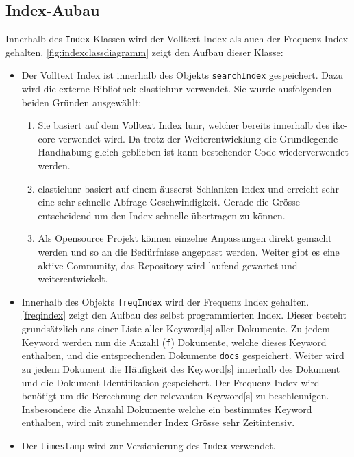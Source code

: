 \subsection{Index-Aubau}\label{indexstructure}
Innerhalb des \texttt{Index} Klassen wird der Volltext Index als auch der Frequenz Index gehalten. \autoref{fig:indexclassdiagramm} zeigt den Aufbau dieser Klasse:
\begin{itemize}
  \item Der Volltext Index ist innerhalb des Objekts \texttt{searchIndex} gespeichert. Dazu wird die externe Bibliothek \gls{elasticlunr} verwendet. Sie wurde ausfolgenden beiden Gründen ausgewählt:
  \begin{enumerate}
       \item Sie basiert auf dem Volltext Index \gls{lunr}, welcher bereits innerhalb des \gls{ikc-core} verwendet wird. Da trotz der Weiterentwicklung die Grundlegende Handhabung gleich geblieben ist kann bestehender Code wiederverwendet werden.
       \item \gls{elasticlunr} basiert auf einem äusserst Schlanken Index und erreicht sehr eine sehr schnelle Abfrage Geschwindigkeit. Gerade die Grösse entscheidend um den Index schnelle übertragen zu können.
       \item Als Opensource Projekt können einzelne Anpassungen direkt gemacht werden und so an die Bedürfnisse angepasst werden. Weiter gibt es eine aktive Community, das Repository wird laufend gewartet und weiterentwickelt.
  \end{enumerate}
  \item Innerhalb des Objekts \texttt{freqIndex} wird der Frequenz Index gehalten. \autoref{freqindex} zeigt den Aufbau des selbst programmierten Index. Dieser besteht grundsätzlich aus einer Liste aller \gls{Keyword}[s] aller Dokumente. Zu jedem \gls{Keyword} werden nun die Anzahl (\texttt{f}) Dokumente, welche dieses \gls{Keyword} enthalten, und die entsprechenden Dokumente \texttt{docs} gespeichert. Weiter wird zu jedem Dokument die Häufigkeit des \gls{Keyword}[s] innerhalb des Dokument und die Dokument Identifikation gespeichert. Der Frequenz Index wird benötigt um die Berechnung der relevanten \gls{Keyword}[s] zu beschleunigen. Insbesondere die Anzahl Dokumente welche ein bestimmtes \gls{Keyword} enthalten, wird mit zunehmender Index Grösse sehr Zeitintensiv. 
  \item Der \texttt{timestamp} wird zur Versionierung des \texttt{Index} verwendet.
\end{itemize}


